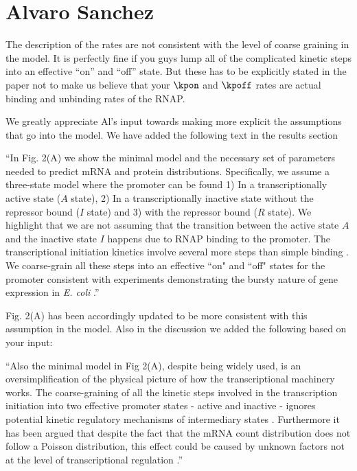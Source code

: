 \section{Alvaro Sanchez}

\begin{tcolorbox}
The description of the rates are not consistent with the level of coarse
graining in the model. It is perfectly fine if you guys lump all of the
complicated kinetic steps into an effective ``on'' and ``off'' state. But these
has to be explicitly stated in the paper not to make us believe that your
$\kpon$ and $\kpoff$ rates are actual binding and unbinding rates of the RNAP.
\end{tcolorbox}

We greatly appreciate Al's input towards making more explicit the assumptions
that go into the model. We have added the following text in the results section

``In Fig. 2(A) we show the minimal model and the necessary set of parameters
needed to predict mRNA and protein distributions. Specifically, we assume a
three-state model where the promoter can be found 1) In a transcriptionally
active state ($A$ state), 2) In a transcriptionally inactive state without the
repressor bound ($I$ state) and 3) with the repressor bound ($R$ state). We
highlight that we are not assuming that the transition between the active state
$A$ and the inactive state $I$ happens due to RNAP binding to the promoter. The
transcriptional initiation kinetics involve several more steps than simple
binding \cite{Browning2004}. We coarse-grain all these steps into an effective
``on" and ``off" states for the promoter consistent with experiments
demonstrating the bursty nature of gene expression in {\it E. coli}
\cite{Golding2005}.''

Fig. 2(A) has been accordingly updated to be more consistent with this
assumption in the model. Also in the discussion we added the following based on
your input:

``Also the minimal model in Fig 2(A), despite being widely used, is an
oversimplification of the physical picture of how the transcriptional machinery
works. The coarse-graining of all the kinetic steps involved in the
transcription initiation into two effective promoter states - active and
inactive - ignores potential kinetic regulatory mechanisms of intermediary
states \cite{Scholes2017}. Furthermore it has been argued that despite the fact
that the mRNA count distribution does not follow a Poisson distribution, this
effect could be caused by unknown factors not at the level of transcriptional
regulation \cite{Choubey2018}.''
